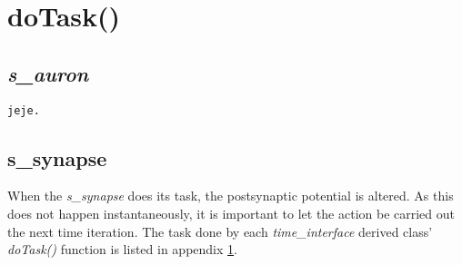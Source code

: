 \chapter{doTask()} %
\label{appendixDifferentDoTaskFunctions} 

\section{\emph{s\_auron}}
\begin{lstlisting}
jeje.
\end{lstlisting}

\section{s\_synapse}
	When the \emph{s\_synapse} does its task, the postsynaptic potential is altered. 
	As this does not happen instantaneously, it is important to let the action be carried out the next time iteration. 
	The task done by each \emph{time\_interface} derived class' \emph{doTask()} function is listed in appendix \ref{appendixDifferentDoTaskFunctions}.

